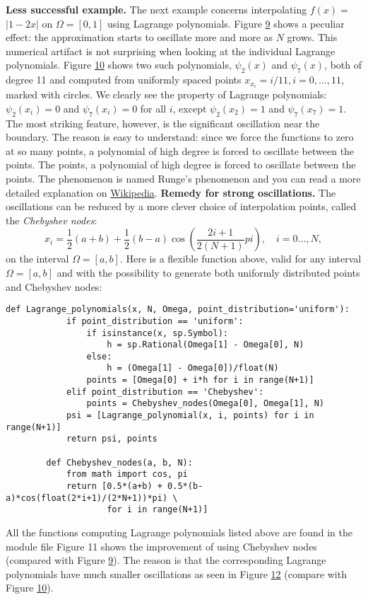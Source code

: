 \documentclass[../main.tex]{subfiles}
\begin{document}
	\noindent \textbf{Less successful example.} The next example concerns interpolating $f(x)=$ $|1-2 x|$ on $\Omega=[0,1]$ using Lagrange polynomials. Figure \hyperref[fig:img_9]{9} shows a peculiar effect: the approximation starts to oscillate more and more as $N$ grows. This numerical artifact is not surprising when looking at the individual Lagrange polynomials. Figure \hyperref[fig:img_10]{10} shows two such polynomials, $\psi_{2}(x)$ and $\psi_{7}(x)$, both of degree 11 and computed from uniformly spaced points $x_{x_{i}}=i / 11, i=0, \ldots, 11$, marked with circles. We clearly see the property of Lagrange polynomials: $\psi_{2}\left(x_{i}\right)=0$ and $\psi_{7}\left(x_{i}\right)=0$ for all $i$, except $\psi_{2}\left(x_{2}\right)=1$ and $\psi_{7}\left(x_{7}\right)=1$. The most striking feature, however, is the significant oscillation near the boundary. The reason is easy to understand: since we force the functions to zero at so many points, a polynomial of high degree is forced to oscillate between the points. The points, a polynomial of high degree is forced to oscillate between the points. The phenomenon is named Runge's phenomenon and you can read a more detailed explanation on \href{https://en.wikipedia.org/wiki/Runge%27s_phenomenon}{Wikipedia}.
	\bigbreak
	\noindent \textbf{Remedy for strong oscillations.} The oscillations can be reduced by a more clever choice of interpolation points, called the \textit{Chebyshev nodes}:
	\begin{equation}\label{eqa50}
		x_{i}=\frac{1}{2}(a+b)+\frac{1}{2}(b-a) \cos \left(\frac{2 i+1}{2(N+1)} p i\right), \quad i=0 \ldots, N,
	\end{equation}
	on the interval $\Omega=[a, b]$. Here is a flexible  function above, valid for any interval $\Omega=[a, b]$ and with the possibility to generate both uniformly distributed points and Chebyshev nodes:
	\begin{lstlisting}[numbers=none]
		def Lagrange_polynomials(x, N, Omega, point_distribution='uniform'):
			if point_distribution == 'uniform':
				if isinstance(x, sp.Symbol):
					h = sp.Rational(Omega[1] - Omega[0], N)
				else:
					h = (Omega[1] - Omega[0])/float(N)
				points = [Omega[0] + i*h for i in range(N+1)]
			elif point_distribution == 'Chebyshev':
				points = Chebyshev_nodes(Omega[0], Omega[1], N)
			psi = [Lagrange_polynomial(x, i, points) for i in range(N+1)]
			return psi, points
			
		def Chebyshev_nodes(a, b, N):
			from math import cos, pi
			return [0.5*(a+b) + 0.5*(b-a)*cos(float(2*i+1)/(2*N+1))*pi) \
					for i in range(N+1)]
	\end{lstlisting}
	All the functions computing Lagrange polynomials listed above are found in the module file  Figure 11 shows the improvement of using Chebyshev nodes (compared with Figure \hyperref[fig:img_9]{9}). The reason is that the corresponding Lagrange polynomials have much smaller oscillations as seen in Figure \hyperref[fig:img_12]{12} (compare with Figure \hyperref[fig:img_10]{10}).
	
\end{document}
